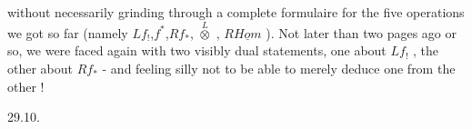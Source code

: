 without necessarily grinding through a complete formulaire for the
five operations we got so far (namely $Lf_{!}$,$f^{*}$,$Rf_{*}$, $\overset{L}{\otimes}$ , $R\underline{Hom}$ ). Not
later than two pages ago or so, we were faced again with two visibly
dual statements, one about $Lf_{!}$ , the other about $Rf_{*}$ - and feeling
silly not to be able to merely deduce one from the other !

29.10.

